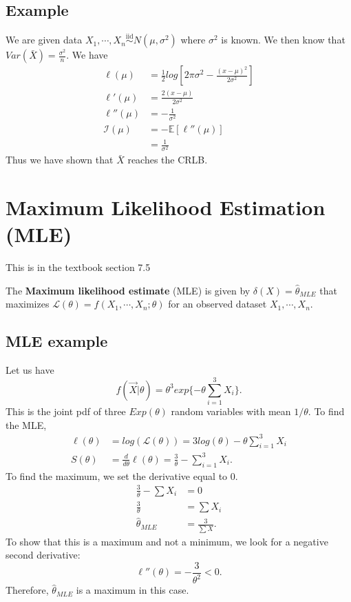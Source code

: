 \documentclass[titlepage, 12pt, leqno]{article}
\begin{document}
\subsection{Example}
We are given data $X_{1}, \cdots ,X_{n} \overset{\mathrm{iid}}{\sim}N(\mu,
\sigma^{2})$ where $\sigma^{2}$ is known. We then know that $Var(\bar X)=
\frac{\sigma^{2}}{n}$. We have
\begin{align*}
    \ell(\mu) &= \frac{1}{2}log\left[2\pi\sigma^{2}- \frac{(x-\mu)^{2}}
    {2\sigma^{2}}\right]  \\
    \ell'(\mu) &= \frac{2(x-\mu)}{2\sigma^{2}}\\
    \ell''(\mu)&= -\frac{1}{\sigma^{2}} \\
    \mathcal{I}(\mu) &= -\mathbb{E}[\ell''(\mu)] \\
                     &= \frac{1}{\sigma^{2}}
\end{align*}
Thus we have shown that $\bar X$ reaches the CRLB.

\pagebreak
\section{Maximum Likelihood Estimation (MLE)}
\begin{note}
    This is in the textbook section 7.5
\end{note}
\begin{definition}
    The \textbf{Maximum likelihood estimate} (MLE) is given by $\delta(X) = 
    \hat \theta_{MLE}$ that maximizes $\mathcal{L}(\theta) = f(X_{1}, \cdots 
    ,X_{n};\theta)$ for an observed dataset $X_{1}, \cdots ,X_{n}$.
\end{definition}

\subsection{MLE example}

Let us have
\[
    f(\vec X|\theta) = \theta^{3}exp\{-\theta \sum_{i=1}^{3}X_{i}\}.
\]
This is the joint pdf of three $Exp(\theta)$ random variables with mean
$1/\theta$. To find the MLE,
\begin{align*}
    \ell(\theta) &= log(\mathcal{L}(\theta)) = 3log(\theta)
    -\theta \sum_{i=1}^{3}X_{i} \\
    S(\theta) &= \frac{d}{d \theta}\ell(\theta) = \frac{3}{\theta} - 
    \sum_{i=1}^{3} X_{i}.
\end{align*}
To find the maximum, we set the derivative equal to 0.
\begin{align*}
    \frac{3}{\theta} - \sum X_{i} &= 0 \\
    \frac{3}{\theta} &= \sum X_{i} \\
    \hat \theta_{MLE} &= \frac{3}{\sum X}.
\end{align*}
To show that this is a maximum and not a minimum, we look for a negative
second derivative:
\[
\ell''(\theta) = -\frac{3}{\theta^{2}} < 0.
\]
Therefore, $\hat \theta_{MLE}$ is a maximum in this case.
\end{document}
